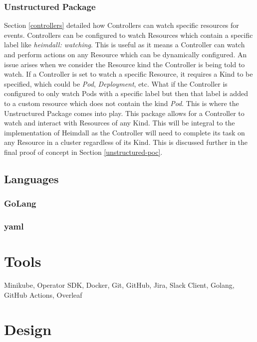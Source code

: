 \documentclass{article}
\begin{document}
\subsubsection{Unstructured Package}

Section \ref{controllers} detailed how Controllers can watch specific resources for events. Controllers can be configured to watch Resources which contain a specific label like \emph{heimdall: watching}. This is useful as it means a Controller can watch and perform actions on any Resource which can be dynamically configured. An issue arises when we consider the Resource kind the Controller is being told to watch. If a Controller is set to watch a specific Resource, it requires a Kind to be specified, which could be \emph{Pod}, \emph{Deployment}, etc. What if the Controller is configured to only watch Pods with a specific label but then that label is added to a custom resource which does not contain the kind \emph{Pod}. This is where the Unstructured Package comes into play. This package allows for a Controller to watch and interact with Resources of any Kind. This will be integral to the implementation of Heimdall as the Controller will need to complete its task on any Resource in a cluster regardless of its Kind. This is discussed further in the final proof of concept in Section \ref{unstructured-poc}.




\subsection{Languages}
\subsubsection{GoLang}
\subsubsection{yaml}



\section{Tools}
Minikube, Operator SDK, Docker, Git, GitHub, Jira, Slack Client, Golang, GitHub Actions, Overleaf



\section{Design}
\end{document}
